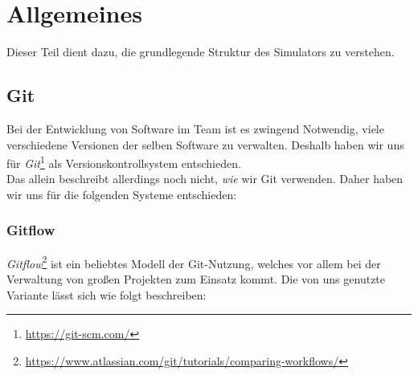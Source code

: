 
\section{Allgemeines}

Dieser Teil dient dazu, die grundlegende Struktur des Simulators zu verstehen.


\subsection{Git}
Bei der Entwicklung von Software im Team ist es zwingend Notwendig, viele verschiedene Versionen
der selben Software zu verwalten. Deshalb haben wir uns für
\textit{Git}\footnote{\url{https://git-scm.com/}} als Versionskontrollsystem entschieden. \\
Das allein beschreibt allerdings noch nicht, \textit{wie} wir Git verwenden. Daher haben wir uns für
die folgenden Systeme entschieden:

\subsubsection{Gitflow}

\textit{Gitflow}\footnote{\url{https://www.atlassian.com/git/tutorials/comparing-workflows/}} ist
ein beliebtes Modell der Git-Nutzung, welches vor allem bei der Verwaltung von großen Projekten
zum Einsatz kommt. Die von uns genutzte Variante lässt sich wie folgt beschreiben:


